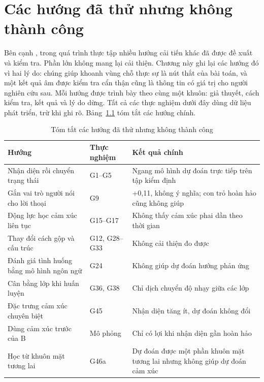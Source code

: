 \clearpage
{}
\chapter[CÁC HƯỚNG ĐÃ THỬ NHƯNG KHÔNG THÀNH CÔNG]{Các hướng đã thử nhưng không thành công}
\label{chap:negative}

Bên cạnh \model{}, trong quá trình thực tập nhiều hướng cải tiến khác đã được đề xuất và kiểm tra. Phần lớn không mang lại cải thiện. Chương này ghi lại các hướng đó vì hai lý do: chúng giúp khoanh vùng chỗ thực sự là nút thắt của bài toán, và một kết quả âm được kiểm tra cẩn thận cũng là thông tin có giá trị cho người nghiên cứu sau. Mỗi hướng được trình bày theo cùng một khuôn: giả thuyết, cách kiểm tra, kết quả và lý do dừng. Tất cả các thực nghiệm dưới đây dùng dữ liệu phát triển, trừ khi ghi rõ. Bảng~\ref{tab:negative} tóm tắt các hướng chính.

\begin{table}[!htb]
\centering
\caption{Tóm tắt các hướng đã thử nhưng không thành công}
\label{tab:negative}
{\fontsize{11}{13}\selectfont
\begin{tabular}{>{\raggedright}p{4.2cm}>{\raggedright}p{2.2cm}>{\raggedright\arraybackslash}p{8.2cm}}
\toprule
Hướng & Thực nghiệm & Kết quả chính \\
\midrule
Nhận diện rồi chuyển trạng thái & G1--G5 & Ngang mô hình dự đoán trực tiếp trên tập kiểm định \\
Gắn vai trò người nói cho lời thoại & G9 & +0,11, không ý nghĩa; con trỏ hoàn hảo cũng không giúp \\
Động lực học cảm xúc liên tục & G15--G17 & Không thấy cảm xúc phai dần theo thời gian \\
Thay đổi cách gộp và cấu trúc & G12, G28--G33 & Không cải thiện đo được \\
Đánh giá tình huống bằng mô hình ngôn ngữ & G24 & Không giúp dự đoán hướng phản ứng \\
Cân bằng lớp khi huấn luyện & G36, G38 & Chỉ dịch chuyển độ nhạy giữa các lớp \\
Đặc trưng cảm xúc chuyên biệt & G45 & Nhận diện tăng ít, dự đoán không đổi \\
Dùng cảm xúc trước của B & Mô phỏng & Chỉ có lợi khi nhận diện gần hoàn hảo \\
Học từ khuôn mặt tương lai & G46a & Dự đoán được một phần khuôn mặt tương lai nhưng không giúp dự đoán cảm xúc \\
\bottomrule
\end{tabular}}
\end{table}

